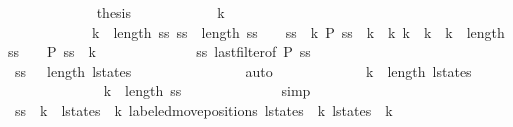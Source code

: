 \begin{isabellebody}
\ \ \ \ \ \ \ \ \ \ \isamarkupfalse%
\ {\isachardoublequoteopen}{\isasymnot}\ {\isacharquery}thesis{\isachardoublequoteclose}\isanewline
\ \ \ \ \ \ \ \ \ \ \isamarkupfalse%
\ k\ \ \isanewline
\ \ \ \ \ \ \ \ \ \ \ \ {\isachardoublequoteopen}k\ {\isacharless}\ length\ {\isacharquery}ss{\isachardoublequoteclose}\ {\isachardoublequoteopen}ss\ {\isacharbang}\ {\isacharparenleft}length\ ss\ {\isacharminus}\ {}{\isacharparenright}\ {\isacharequal}\ {\isacharquery}ss\ {\isacharbang}\ k{\isachardoublequoteclose}\ {\isachardoublequoteopen}{\isacharquery}P\ {\isacharparenleft}{\isacharquery}ss\ {\isacharbang}\ k{\isacharparenright}{\isachardoublequoteclose}\ {\isachardoublequoteopen}{\isasymforall}\ k{\isacharprime}{\isachardot}\ k\ {\isacharless}\ k{\isacharprime}\ {\isasymand}\ k{\isacharprime}\ {\isacharless}\ length\ {\isacharquery}ss\ {\isasymlongrightarrow}\ \ {\isasymnot}\ {\isacharquery}P\ {\isacharparenleft}{\isacharquery}ss\ {\isacharbang}\ k{\isacharprime}{\isacharparenright}{\isachardoublequoteclose}\isanewline
\ \ \ \ \ \ \ \ \ \ \ \ \isamarkupfalse%
\ ss\ last{\isacharunderscore}filter{\isacharbrackleft}of\ {\isacharquery}P\ {\isacharquery}ss{\isacharbrackright}\isanewline
\ \ \ \ \ \ \ \ \ \ \ \ \isamarkupfalse%
\ {\isacharbackquoteopen}ss\ {\isasymnoteq}\ {\isacharbrackleft}{\isacharbrackright}{\isacharbackquoteclose}\ {\isacharbackquoteopen}length\ l{\isacharunderscore}states\ {\isasymge}\ {}{\isacharbackquoteclose}\isanewline
\ \ \ \ \ \ \ \ \ \ \ \ \isamarkupfalse%
\ auto\isanewline
\ \ \ \ \ \ \ \ \ \ \isamarkupfalse%
\ \ {\isachardoublequoteopen}k\ {\isacharless}\ length\ l{\isacharunderscore}states\ {\isacharminus}\ {}{\isachardoublequoteclose}\isanewline
\ \ \ \ \ \ \ \ \ \ \ \ \isamarkupfalse%
\ {\isacharbackquoteopen}k\ {\isacharless}\ length\ {\isacharquery}ss{\isacharbackquoteclose}\isanewline
\ \ \ \ \ \ \ \ \ \ \ \ \isamarkupfalse%
\ simp\isanewline
\ \ \ \ \ \ \ \ \ \ \isamarkupfalse%
\ {\isachardoublequoteopen}{\isacharquery}ss\ {\isacharbang}\ k\ {\isacharequal}\ {\isacharparenleft}l{\isacharunderscore}states\ {\isacharbang}\ k{\isacharcomma}\ labeled{\isacharunderscore}move{\isacharunderscore}positions\ {\isacharparenleft}l{\isacharunderscore}states\ {\isacharbang}\ k{\isacharparenright}\ {\isacharparenleft}l{\isacharunderscore}states\ {\isacharbang}\ {\isacharparenleft}k{\isacharplus}{}{\isacharparenright}{\isacharparenright}{\isacharparenright}{\isachardoublequoteclose}\isanewline

\end{isabellebody}
